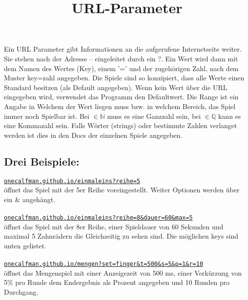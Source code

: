 \documentclass[a4paper]{article}
\title{URL-Parameter}
\begin{document}
\maketitle

\begin{multicols}{2}
Ein URL Parameter gibt Informationen an die aufgerufene Internetseite weiter. Sie stehen nach der Adresse -- eingeleitet durch ein ?.
Ein Wert wird dann mit dem Namen des Wertes (Key), einem '=' und der zugehörigen Zahl, nach dem Muster key=zahl angegeben. Die Spiele sind so konzipiert, dass alle Werte einen Standard besitzen (als Default angegeben). Wenn kein Wert über die URL eingegeben wird, verwendet das Programm den Defaultwert.
Die Range ist ein Angabe in Welchem der Wert liegen muss bzw. in welchem Bereich, das Spiel immer noch Spielbar ist. Bei $\in \mathbb{N} $ muss es eine Ganzzahl sein, bei $\in \mathbb{Q} $ kann es eine Kommazahl sein. Falls Wörter (strings) oder bestimmte Zahlen verlanget werden ist dies in den Docs der einzelnen Spiele angegeben.
\end{multicols}

\subsection*{Drei Beispiele:}
\texttt{\href{onecalfman.github.io/einmaleins?reihe=5}{onecalfman.github.io/einmaleins?reihe=5}} \\
öffnet das Spiel mit der 5er Reihe voreingestellt.
Weiter Optionen werden über ein \& angehängt. \\\\

\texttt{\href{onecalfman.github.io/einmaleins?reihe=8\&dauer=60\&max=5}{onecalfman.github.io/einmaleins?reihe=8\&dauer=60\&max=5}} \\
öffnet das Spiel mit der 8er Reihe, einer Spieldauer von 60 Sekunden und maximal 5 Zahnrädern die Gleichzeitig zu sehen sind. Die möglichen keys sind unten gelistet. \\\\

\texttt{\href{onecalfman.github.io/mengen?set=finger\&t=500\&s=5\&p=1\&r=10}{onecalfman.github.io/mengen?set=finger\&t=500\&s=5\&p=1\&r=10}} \\
öffnet das Mengenspiel mit einer Anzeigezeit von 500 ms, einer Verkürzung von 5\% pro Runde dem Endergebnis als Prozent angegeben und 10 Runden pro Durchgang.
\end{document}
